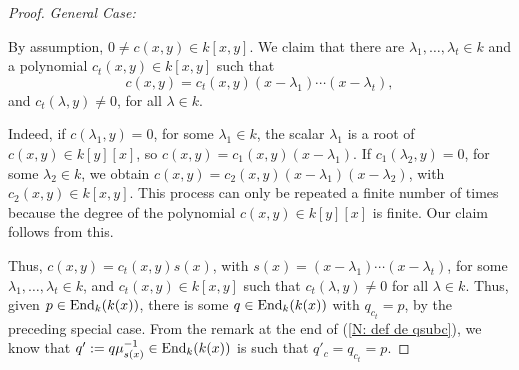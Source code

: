 \documentclass{article}
\theoremstyle{definition}
\newcommand{\End}{{ \rm End }}
\begin{document}
\begin{proof}
\noindent\emph{General Case:} 
\medskip

By assumption, $0\not=c(x,y)\in k[x,y]$. We claim that there are $\lambda_1,\ldots,\lambda_t\in k$ and a polynomial $c_t(x,y)\in k[x,y]$ such that 
$$c(x,y)=c_t(x,y)(x-\lambda_1)\cdots(x-\lambda_t),$$
and $c_t(\lambda,y)\not=0$, for all $\lambda\in k$. 

Indeed, if $c(\lambda_1,y)=0$, for some $\lambda_1\in k$, the scalar $\lambda_1$ is a root of $c(x,y)\in k[y][x]$, so $c(x,y)=c_1(x,y)(x-\lambda_1)$. If $c_1(\lambda_2,y)=0$, for some $\lambda_2\in k$, we obtain $c(x,y)=c_2(x,y)(x-\lambda_1)(x-\lambda_2)$, with $c_2(x,y)\in k[x,y]$. This process can only be repeated a finite number of times because the degree of the polynomial $c(x,y)\in k[y][x]$ is finite. Our claim follows from this. 


Thus, 
  $c(x,y)=c_t(x,y)s(x)$, with $s(x)=(x-\lambda_1)\cdots(x-\lambda_t)$, for some $\lambda_1,\ldots,\lambda_t\in k$, and $c_t(x,y)\in k[x,y]$ such that $c_t(\lambda,y)\not=0$ for all $\lambda\in k$. Thus, given $p\in \End_k(k(x))$, there is some $q\in \End_k(k(x))$ with $q_{c_t}=p$, by the preceding special case. From the remark at the end of (\ref{N: def de qsubc}), we know that $q':=q\mu^{-1}_{s(x)}\in \End_k(k(x))$ is such that $q'_c=q_{c_t}=p$. 
\end{proof}
\end{document}
